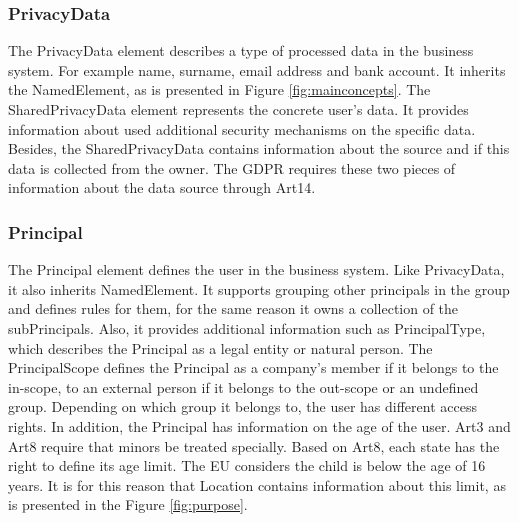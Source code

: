 \documentclass[11pt,english]{article}
\begin{document}
\subsubsection{PrivacyData}
The PrivacyData element describes a type of processed data in the business system. For example name, surname, email address and bank account. It inherits the NamedElement, as is presented in Figure \ref{fig:mainconcepts}. The SharedPrivacyData element represents the concrete user's data. It provides information about used additional security mechanisms on the specific data. Besides, the SharedPrivacyData contains information about the source and if this data is collected from the owner. The GDPR requires these two pieces of information about the data source through Art14.
\subsubsection{Principal}
The Principal element defines the user in the business system. Like PrivacyData, it also inherits NamedElement. It supports grouping other principals in the group and defines rules for them, for the same reason it owns a collection of the subPrincipals. Also, it provides additional information such as PrincipalType, which describes the Principal as a legal entity or natural person. The PrincipalScope defines the Principal as a company's member if it belongs to the in-scope, to an external person if it belongs to the out-scope or an undefined group. Depending on which group it belongs to, the user has different access rights. In addition, the Principal has information on the age of the user. Art3 and Art8 require that minors be treated specially. Based on Art8, each state has the right to define its age limit. The EU considers the child is below the age of 16 years. It is for this reason that Location contains information about this limit, as is presented in the Figure \ref{fig:purpose}.
\end{document}
